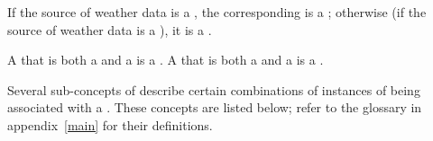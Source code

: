 If the source of weather data is a , the corresponding  is a ; otherwise (if the source of weather data is a ), it is a .

A  that is both a  and a  is a . A  that is both a  and a  is a .

Several sub-concepts of  describe certain combinations of instances of  being associated with a . These concepts are listed below; refer to the glossary in appendix~\ref{main} for their definitions.

